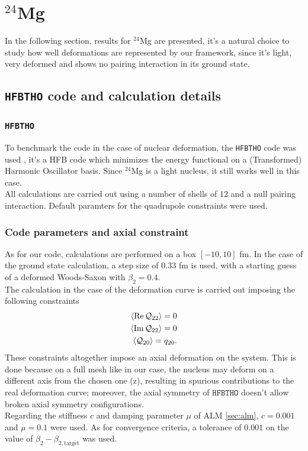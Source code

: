 \section{$^{24}$Mg}
In the following section, results for $^{24}$Mg are presented, it's a natural choice to study how well deformations are represented by our framework, since it's light, very deformed and shows no pairing interaction in its ground state.
\subsection{\texttt{HFBTHO} code and calculation details}
\subsubsection{\texttt{HFBTHO}}
To benchmark the code in the case of nuclear deformation, the \texttt{HFBTHO} code was used \cite{MAREVIC2022108367}, it's a HFB code which minimizes the energy functional on a (Transformed) Harmonic Oscillator basis. Since $^{24}$Mg is a light nucleus, it still works well in this case.
\\All calculations are carried out using a number of shells of $12$ and a null pairing interaction. Default paramters for the quadrupole constraints were used.
\subsubsection{Code parameters and axial constraint}
As for our code, calculations are performed on a box $[-10, 10]$ fm.
In the case of the ground state calculation, a step size of $0.33$ fm is used, with a starting guess of a deformed Woods-Saxon with $\beta_2=0.4$.
\\The calculation in the case of the deformation curve is carried out imposing the following constraints
\begin{align}
  \expval{\Re\mathcal Q_{22}} = 0
  \\\expval{\Im \mathcal Q_{22}} = 0
  \\\expval{\mathcal Q_{20}} = q_{20}.
\end{align}
These constraints altogether impose an axial deformation on the system. This is done because on a full mesh like in our case, the nucleus may deform on a different axis from the chosen one (z), resulting in spurious contributions to the real deformation curve; moreover, the axial symmetry of $\texttt{HFBTHO}$ doesn't allow broken axial symmetry configurations.
\\Regarding the stiffness $c$ and damping parameter $\mu$ of ALM \ref{sec:alm}, $c=0.001$ and $\mu=0.1$ were used. As for convergence criteria, a tolerance of $0.001$ on the value of $\beta_2 - \beta_{2, \text{target}}$ was used.
